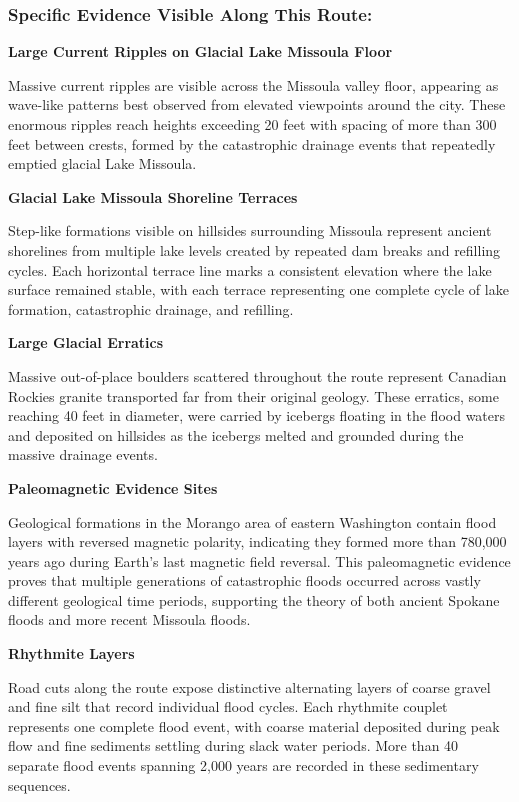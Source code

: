 \documentclass[
  11pt,
  letterpaper,
  DIV=10,
  numbers=noendperiod]{scrartcl}
\begin{document}
\subsubsection{\texorpdfstring{\textbf{Specific Evidence Visible Along
This
Route:}}{Specific Evidence Visible Along This Route:}}\label{specific-evidence-visible-along-this-route}

\textbf{Large Current Ripples on Glacial Lake Missoula Floor}

Massive current ripples are visible across the Missoula valley floor,
appearing as wave-like patterns best observed from elevated viewpoints
around the city. These enormous ripples reach heights exceeding 20 feet
with spacing of more than 300 feet between crests, formed by the
catastrophic drainage events that repeatedly emptied glacial Lake
Missoula.

\textbf{Glacial Lake Missoula Shoreline Terraces}

Step-like formations visible on hillsides surrounding Missoula represent
ancient shorelines from multiple lake levels created by repeated dam
breaks and refilling cycles. Each horizontal terrace line marks a
consistent elevation where the lake surface remained stable, with each
terrace representing one complete cycle of lake formation, catastrophic
drainage, and refilling.

\textbf{Large Glacial Erratics}

Massive out-of-place boulders scattered throughout the route represent
Canadian Rockies granite transported far from their original geology.
These erratics, some reaching 40 feet in diameter, were carried by
icebergs floating in the flood waters and deposited on hillsides as the
icebergs melted and grounded during the massive drainage events.

\textbf{Paleomagnetic Evidence Sites}

Geological formations in the Morango area of eastern Washington contain
flood layers with reversed magnetic polarity, indicating they formed
more than 780,000 years ago during Earth's last magnetic field reversal.
This paleomagnetic evidence proves that multiple generations of
catastrophic floods occurred across vastly different geological time
periods, supporting the theory of both ancient Spokane floods and more
recent Missoula floods.

\textbf{Rhythmite Layers}

Road cuts along the route expose distinctive alternating layers of
coarse gravel and fine silt that record individual flood cycles. Each
rhythmite couplet represents one complete flood event, with coarse
material deposited during peak flow and fine sediments settling during
slack water periods. More than 40 separate flood events spanning 2,000
years are recorded in these sedimentary sequences.
\end{document}
